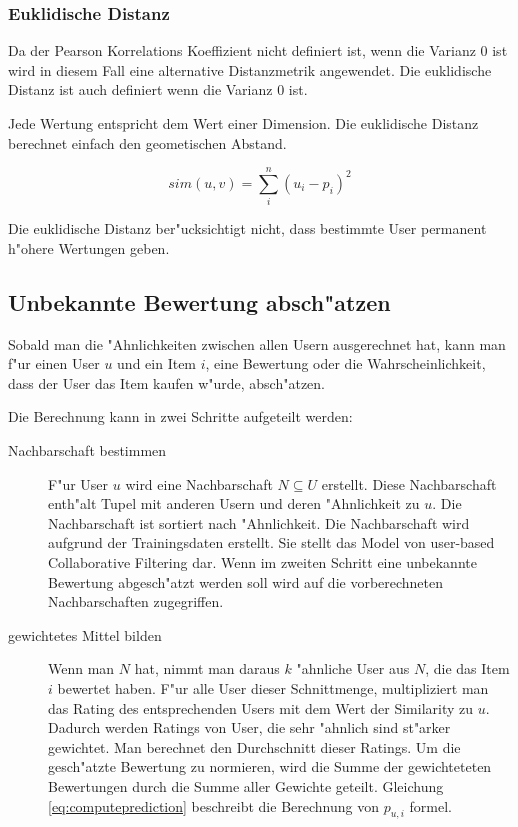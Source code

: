 \documentclass[a4paper, 12pt]{article}
\begin{document}
\subsubsection{Euklidische Distanz}
\label{sec:euclid}

Da der Pearson Korrelations Koeffizient nicht definiert ist, wenn die Varianz 0 ist wird in diesem Fall eine alternative Distanzmetrik angewendet. Die euklidische Distanz ist auch definiert wenn die Varianz 0 ist.

Jede Wertung entspricht dem Wert einer Dimension. Die euklidische Distanz berechnet einfach den geometischen Abstand.

\begin{equation}
  \label{eq:euclid}
 sim(u,v) = \sum_i^n (u_i - p_i )^2
\end{equation}

Die euklidische Distanz ber"ucksichtigt nicht, dass bestimmte User permanent h"ohere Wertungen geben.

\subsection{Unbekannte Bewertung absch"atzen}
\label{sec:compp}

Sobald man die "Ahnlichkeiten zwischen allen Usern ausgerechnet hat, kann man f"ur einen User $u$ und ein Item $i$, eine Bewertung oder die Wahrscheinlichkeit, dass der User das Item kaufen w"urde, absch"atzen.

Die Berechnung kann in zwei Schritte aufgeteilt werden:
\begin{description}
\item[Nachbarschaft bestimmen] F"ur User $u$ wird eine Nachbarschaft $N \subseteq U$ erstellt. Diese Nachbarschaft enth"alt Tupel mit anderen Usern und deren "Ahnlichkeit zu $u$. Die Nachbarschaft ist sortiert nach "Ahnlichkeit. Die Nachbarschaft wird aufgrund der Trainingsdaten erstellt. Sie stellt das Model von user-based Collaborative Filtering dar. Wenn im zweiten Schritt eine unbekannte Bewertung abgesch"atzt werden soll wird auf die vorberechneten Nachbarschaften zugegriffen.
\item [gewichtetes Mittel bilden] Wenn man $N$ hat, nimmt man daraus $k$ "ahnliche User aus $N$, die das Item $i$ bewertet haben. F"ur alle User dieser Schnittmenge, multipliziert man das Rating des entsprechenden Users mit dem Wert der Similarity zu $u$. Dadurch werden Ratings von User, die sehr "ahnlich sind st"arker gewichtet. Man berechnet den Durchschnitt dieser Ratings. Um die gesch"atzte Bewertung zu normieren, wird die Summe der gewichteteten Bewertungen durch die Summe aller Gewichte geteilt. Gleichung \ref{eq:computeprediction} beschreibt die Berechnung von $p_{u,i}$ formel.
\end{description}
\end{document}
